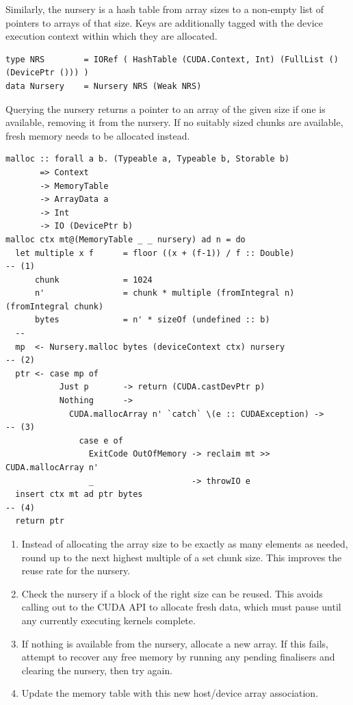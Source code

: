 Similarly, the nursery is a hash table from array sizes to a non-empty list of
pointers to arrays of that size. Keys are additionally tagged with the device
execution context within which they are allocated.
%
\begin{lstlisting}[style=haskell]
type NRS        = IORef ( HashTable (CUDA.Context, Int) (FullList () (DevicePtr ())) )
data Nursery    = Nursery NRS (Weak NRS)
\end{lstlisting}
%
Querying the nursery returns a pointer to an array of the given size if one is
available, removing it from the nursery. If no suitably sized chunks are
available, fresh memory needs to be allocated instead.
%
\begin{lstlisting}[style=haskell]
malloc :: forall a b. (Typeable a, Typeable b, Storable b)
       => Context
       -> MemoryTable
       -> ArrayData a
       -> Int
       -> IO (DevicePtr b)
malloc ctx mt@(MemoryTable _ _ nursery) ad n = do
  let multiple x f      = floor ((x + (f-1)) / f :: Double)             -- (1)
      chunk             = 1024
      n'                = chunk * multiple (fromIntegral n) (fromIntegral chunk)
      bytes             = n' * sizeOf (undefined :: b)
  --
  mp  <- Nursery.malloc bytes (deviceContext ctx) nursery               -- (2)
  ptr <- case mp of
           Just p       -> return (CUDA.castDevPtr p)
           Nothing      ->
             CUDA.mallocArray n' `catch` \(e :: CUDAException) ->       -- (3)
               case e of
                 ExitCode OutOfMemory -> reclaim mt >> CUDA.mallocArray n'
                 _                    -> throwIO e
  insert ctx mt ad ptr bytes                                            -- (4)
  return ptr
\end{lstlisting}
%
\begin{enumerate}
\item Instead of allocating the array size to be exactly as many elements as
    needed, round up to the next highest multiple of a set chunk size. This
    improves the reuse rate for the nursery.

\item Check the nursery if a block of the right size can be reused. This avoids
    calling out to the CUDA API to allocate fresh data, which must pause until
    any currently executing kernels complete.

\item If nothing is available from the nursery, allocate a new array. If this
    fails, attempt to recover any free memory by running any pending finalisers
    and clearing the nursery, then try again.

\item Update the memory table with this new host/device array association.

\end{enumerate}

